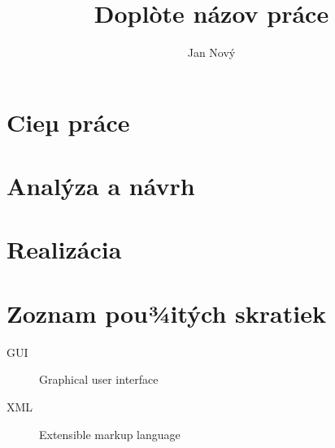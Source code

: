 \documentclass[thesis=M,slovak]{FITthesis}[2019/03/21]
\title{Doplòte názov práce}
\author{Jan Nový} %
\begin{document}

\begin{introduction}
\end{introduction}

\chapter{Cieµ práce}

\chapter{Analýza a návrh}

\chapter{Realizácia}

\begin{conclusion}
\end{conclusion}




\appendix

\chapter{Zoznam pou¾itých skratiek}
\begin{description}
	\item[GUI] Graphical user interface
	\item[XML] Extensible markup language
\end{description}
\end{document}
